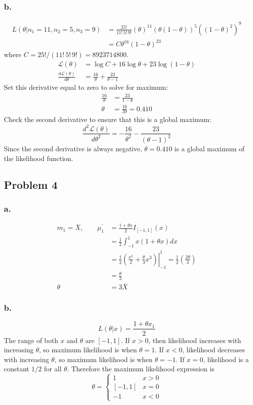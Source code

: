 \documentclass{article}
\begin{document}
\subsubsection*{b.}
\begin{align*}
L(\theta|n_1=11, n_2=5, n_3=9) &= \frac{25!}{11!\,5!\,9!} \left(\theta\right)^11\left(\theta(1-\theta)\right)^5\left(\left(1-\theta\right)^2\right)^9 \\
&=C\theta^{16}\left(1-\theta\right)^{23}
\end{align*}
where $C = 25!/(11!\,5!\,9!) = 8923714800$.
\begin{align*}
\mathcal{L}(\theta) &= \log{C} + 16 \log{\theta} + 23 \log{(1-\theta)} \\
\frac{d\mathcal{L}(\theta)}{d\theta} &= \frac{16}{\theta}+\frac{23}{\theta-1}
\end{align*}
Set this derivative equal to zero to solve for maximum:
\begin{align*}
\frac{16}{\theta} &= \frac{23}{1-\theta} \\
\theta &= \frac{16}{39} = 0.410
\end{align*}
Check the second derivative to ensure that this is a global maximum:
\[\frac{d^2\mathcal{L}(\theta)}{d\theta^2} = -\frac{16}{\theta^2}-\frac{23}{(\theta-1)^2}\]
Since the second derivative is always negative, $\theta = 0.410$ is a global maximum of the likelihood function. 

\subsection*{Problem 4}
\subsubsection*{a.}
\begin{align*}
m_1 = \bar{X},\quad\quad \mu_1^\prime&=\frac{1+\theta x}{2}I_{[-1,1]}(x) \\
&=\frac{1}{2}\int_{-1}^1 x\left(1+\theta x\right)dx \\
&= \frac{1}{2}\left.\left(\frac{x^2}{2}+\frac{\theta}{3}x^3\right)\right|_{-1}^1 = \frac{1}{2}\left(\frac{2\theta}{3}\right) \\
&= \frac{\theta}{3} \\
\theta &= 3\bar{X}
\end{align*}
\subsubsection*{b.}
\[L(\theta|x) = \frac{1+\theta x_1}{2}\]
The range of both $x$ and $\theta$ are $[-1,1]$. If $x>0$, then likelihood increases with increasing $\theta$, so maximum likelihood is when $\theta =1$. If $x<0$, likelihood decreases with increasing $\theta$, so maximum likelihood is when $\theta = -1$. If $x=0$, likelihood is a constant $1/2$ for all $\theta$. Therefore the maximum likelihood expression is 
\[\theta = \begin{cases}1 & x > 0 \\ [-1,1] & x = 0 \\-1 & x < 0\end{cases}\]
\end{document}
